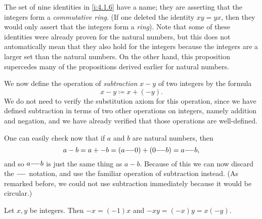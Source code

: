 \begin{rmk}\label{i:4.1.7}
  The set of nine identities in \cref{i:4.1.6} have a name;
  they are asserting that the integers form a \emph{commutative ring}.
  (If one deleted the identity \(xy = yx\), then they would only assert that the integers form a \emph{ring}).
  Note that some of these identities were already proven for the natural numbers, but this does not automatically mean that they also hold for the integers because the integers are a larger set than the natural numbers.
  On the other hand, this proposition supercedes many of the propositions derived earlier for natural numbers.
\end{rmk}

\begin{ac}\label{i:ac:4.1.4}
  We now define the operation of \emph{subtraction} \(x - y\) of two integers by the formula
  \[
    x - y \coloneqq x + (-y).
  \]
  We do not need to verify the substitution axiom for this operation, since we have defined subtraction in terms of two other operations on integers, namely addition and negation, and we have already verified that those operations are well-defined.

  One can easily check now that if \(a\) and \(b\) are natural numbers, then
  \[
    a - b = a + -b = (a {-}\!{-} 0) + (0 {-}\!{-} b) = a {-}\!{-} b,
  \]
  and so \(a {-}\!{-} b\) is just the same thing as \(a - b\).
  Because of this we can now discard the \({-}\!{-}\) notation, and use the familiar operation of subtraction instead.
  (As remarked before, we could not use subtraction immediately because it would be circular.)
\end{ac}

\begin{ac}\label{i:ac:4.1.5}
  Let \(x, y\) be integers.
  Then \(-x = (-1) x\) and \(-xy = (-x) y = x (-y)\).
\end{ac}

